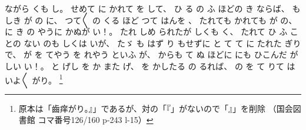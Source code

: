ながら
くも
し。
%
せめて
に
かれて%
を
して、
%
ひ
る
の
ふ
ほどの
き
ならば、
%
もしき
が
の
に、
%
つて〳〵
の
くる
ほど
つて
はんを
、
%
%
たれても
かれても%
が
の、%
%
に
き
の
やうに
かぬが
い！。
%
たれ
しめ
られたが
しくも
く、
%
たれて
ひ
ふ
ことの
ない
のも
しくは
いが、
%
たゞ%
も
はず
り
もせずに
と
て
て
に
たれた
ぎりで、
%
が
を
てやう
を
れやう
といふ
が、%
%
からも
て
ぬ
ほどに
にも
%
ひこんだ
が
しい
い！。
%
と
げし
を
か
また
げ、
%
を
かしたる
の
るれば、
%
の
を
て
りて
は
いよ〳〵
がり。
\footnote{原本は「齒痒がり。』」であるが、対の「『」がないので「』」を削除
（国会図書館 コマ番号126/160 p-243 l-15）}%

